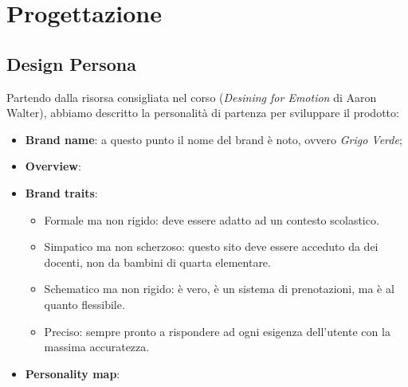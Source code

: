 \section{Progettazione}

\subsection{Design Persona}

Partendo dalla risorsa consigliata nel corso (\textit{Desining for Emotion} di Aaron Walter), abbiamo descritto la personalità di partenza per sviluppare il prodotto:
\begin{itemize}
    \item \textbf{Brand name}: a questo punto il nome del brand è noto, ovvero
    \textit{Grigo Verde};

    \item \textbf{Overview}: 

    \item \textbf{Brand traits}:
        \begin{itemize}
            \item Formale ma non rigido: deve essere adatto ad un contesto scolastico.
            \item Simpatico ma non scherzoso: questo sito deve essere acceduto da dei docenti, non da bambini di quarta elementare.
            \item Schematico ma non rigido: è vero, è un sistema di prenotazioni, ma è al quanto flessibile.
            \item Preciso: sempre pronto a rispondere ad ogni esigenza dell'utente con la massima accuratezza.
        \end{itemize}
    
    \item \textbf{Personality map}:
        \begin{center}
\end{center}
\end{itemize}
